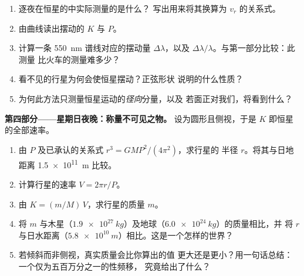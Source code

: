 \begin{problem}
\begin{enumerate}[resume]
  \item 逐夜在恒星的\emph{}中实际测量的是什么？
        写出用来将其换算为 $v_r$ 的关系式。
  \item 由曲线读出摆动的 $K$ 与 $P$。
  \item 计算一条 \qty{550}{nm} 谱线对应的摆动量 $\Delta\lambda$，以及
        $\Delta\lambda/\lambda$。与第一部分比较：此测量
        比火车的测量难多少？
  \item 看不见的行星为何会使恒星摆动？正弦形状
        说明的什么性质？
  \item 为何此方法只测量恒星运动的\emph{径向}分量，以及
        若面正对我们，将看到什么？
\end{enumerate}

\medskip
\noindent\textbf{第四部分——星期日夜晚：称量不可见之物。}
设为圆形且侧视，于是 $K$ 即恒星的全部速率。
\begin{enumerate}[resume]
  \item 由 $P$ 及已承认的关系式 $r^3 = G M P^2/(4\pi^2)$，求行星的
        半径 $r$。将其与日地距离 \qty{1.5e11}{m} 比较。
  \item 计算行星的速率 $V = 2\pi r/P$。
  \item 由 $K = (m/M)\,V$，求行星的质量 $m$。
  \item 将 $m$ 与木星（$\qty{1.9e27}{kg}$）及地球（$\qty{6.0e24}{kg}$）的质量相比，并
        将 $r$ 与日水距离（$\qty{5.8e10}{m}$）相比。这是一个怎样的世界？
  \item 若倾斜而非侧视，真实质量会比你算出的值
        更大还是更小？用一句话总结：一个仅为五百万分之一的性频移，
        究竟给出了什么？
\end{enumerate}
\end{problem}
